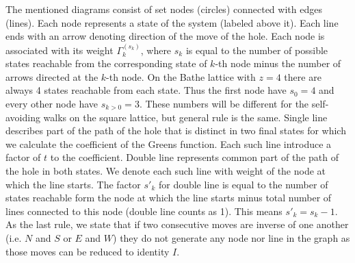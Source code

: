 \documentclass{article}
\begin{document}
The mentioned diagrams consist of set nodes (circles) connected with edges (lines). Each node represents a state of the system (labeled above it). Each line ends with an arrow denoting direction of the move of the hole. Each node is associated with its weight $\Gamma_k^{(s_k)}$, where $s_k$ is equal to the number of possible states reachable from the corresponding state of $k$-th node minus the number of arrows directed at the $k$-th node. On the Bathe lattice with $z=4$ there are always 4 states reachable from each state. Thus the first node have $s_0=4$ and every other node have $s_{k>0}=3$. These numbers will be different for the self-avoiding walks on the square lattice, but general rule is the same. Single line describes part of the path of the hole that is distinct in two final states for which we calculate the coefficient of the Greens function. Each such line introduce a factor of $t$ to the coefficient. Double line represents common part of the path of the hole in both states. We denote each such line with weight of the node at which the line starts. The factor $s'_k$ for double line is equal to the number of states reachable form the node at which the line starts minus total number of lines connected to this node (double line counts as 1). This means $s'_k = s_k - 1$. As the last rule, we state that if two consecutive moves are inverse of one another (i.e. $N$ and $S$ or $E$ and $W$) they do not generate any node nor line in the graph as those moves can be reduced to identity $I$.
\end{document}
